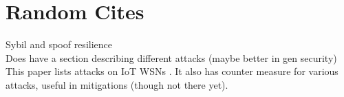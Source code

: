 \section{Random Cites}
Sybil and spoof resilience\cite{Gil2017GuaranteeingSM}\\ %

Does have a section describing different attacks (maybe better in gen security)\cite{Kalam2016BilateralTS}\\

This paper lists attacks on IoT WSNs \cite{Mostefa2017}. It also has counter measure for various attacks, useful in mitigations (though not there yet).